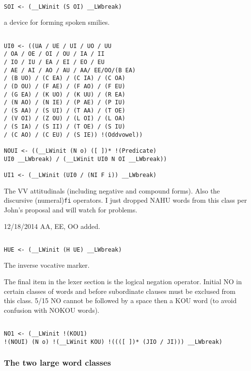 \documentclass[12pt]{article}
\begin{document}
\begin{verbatim}

SOI <- (__LWinit (S OI) __LWbreak)

\end{verbatim}

a device for forming spoken smilies.

\begin{verbatim}

UI0 <- ((UA / UE / UI / UO / UU 
/ OA / OE / OI / OU / IA / II 
/ IO / IU / EA / EI / EO / EU 
/ AE / AI / AO / AU / AA/ EE/OO/(B EA) 
/ (B UO) / (C EA) / (C IA) / (C OA) 
/ (D OU) / (F AE) / (F AO) / (F EU) 
/ (G EA) / (K UO) / (K UU) / (R EA) 
/ (N AO) / (N IE) / (P AE) / (P IU) 
/ (S AA) / (S UI) / (T AA) / (T OE) 
/ (V OI) / (Z OU) / (L OI) / (L OA) 
/ (S IA) / (S II) / (T OE) / (S IU) 
/ (C AO) / (C EU) / (S IE)) !(Oddvowel))

NOUI <- ((__LWinit (N o) ([ ])* !(Predicate) 
UI0 __LWbreak) / (__LWinit UI0 N OI __LWbreak))

UI1 <- (__LWinit (UI0 / (NI F i)) __LWbreak)

\end{verbatim}

The VV attitudinals (including negative and compound forms).  Also the discursive (numeral){\tt fi} operators.
I just dropped NAHU words from this class per John's proposal and will watch for problems.

12/18/2014  AA, EE, OO added.

\begin{verbatim}

HUE <- (__LWinit (H UE) __LWbreak)

\end{verbatim}

The inverse vocative marker.

The final item in the lexer section is the logical negation operator.  Initial NO in certain classes of words and before subordinate clauses must be exclused from this class.
5/15 NO cannot be followed by a space then a KOU word (to avoid confusion with NOKOU words).

\begin{verbatim}

NO1 <- (__LWinit !(KOU1) 
!(NOUI) (N o) !(__LWinit KOU) !((([ ])* (JIO / JI))) __LWbreak)

\end{verbatim}

\subsubsection{The two large word classes}
\end{document}
